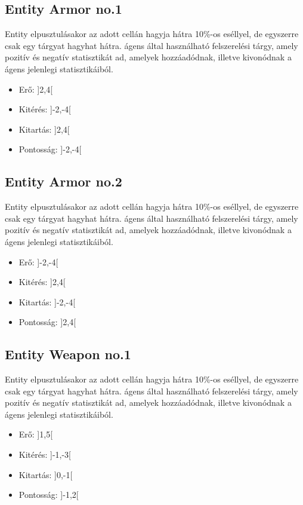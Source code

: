 \subsection{Entity Armor no.1}

Entity elpusztulásakor az adott cellán hagyja hátra 10\%-os eséllyel, de egyszerre csak egy tárgyat hagyhat hátra.
ágens által használható felszerelési tárgy, amely pozitív és negatív statisztikát ad, amelyek hozzáadódnak, illetve kivonódnak a ágens jelenlegi statisztikáiból.

\begin{itemize}
    \item Erő: ]2,4[
    \item Kitérés: ]-2,-4[
    \item Kitartás: ]2,4[
    \item Pontosság: ]-2,-4[
\end{itemize}

\subsection{Entity Armor no.2}

Entity elpusztulásakor az adott cellán hagyja hátra 10\%-os eséllyel, de egyszerre csak egy tárgyat hagyhat hátra.
ágens által használható felszerelési tárgy, amely pozitív és negatív statisztikát ad, amelyek hozzáadódnak, illetve kivonódnak a ágens jelenlegi statisztikáiból.

\begin{itemize}
    \item Erő: ]-2,-4[
    \item Kitérés: ]2,4[
    \item Kitartás: ]-2,-4[
    \item Pontosság: ]2,4[
\end{itemize}

\subsection{Entity Weapon no.1}

Entity elpusztulásakor az adott cellán hagyja hátra 10\%-os eséllyel, de egyszerre csak egy tárgyat hagyhat hátra.
ágens által használható felszerelési tárgy, amely pozitív és negatív statisztikát ad, amelyek hozzáadódnak, illetve kivonódnak a ágens jelenlegi statisztikáiból.

\begin{itemize}
    \item Erő: ]1,5[
    \item Kitérés: ]-1,-3[
    \item Kitartás: ]0,-1[
    \item Pontosság: ]-1,2[
\end{itemize}

